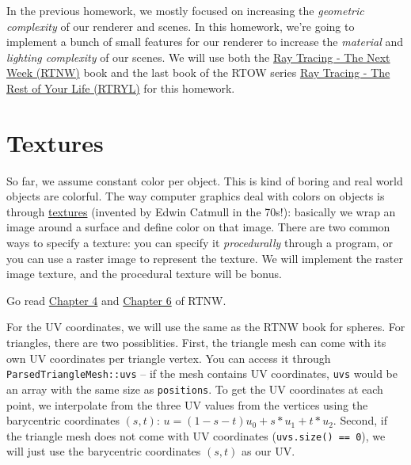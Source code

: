 
\usepackage{xcolor}




In the previous homework, we mostly focused on increasing the \emph{geometric complexity} of our renderer and scenes. In this homework, we're going to implement a bunch of small features for our renderer to increase the \emph{material} and \emph{lighting complexity} of our scenes. We will use both the \href{https://raytracing.github.io/books/RayTracingTheNextWeek.html}{Ray Tracing - The Next Week (RTNW)} book and the last book of the RTOW series \href{https://raytracing.github.io/books/RayTracingTheRestOfYourLife.html}{Ray Tracing - The Rest of Your Life (RTRYL)} for this homework.

\section{Textures}
So far, we assume constant color per object. This is kind of boring and real world objects are {\color{red}c}{\color{orange}o}{\color{green}l}{\color{blue}o}{\color{cyan}r}f{\color{magenta}u}{\color{violet}l}. The way computer graphics deal with colors on objects is through \href{https://en.wikipedia.org/wiki/Texture_mapping}{textures} (invented by Edwin Catmull in the 70s!): basically we wrap an image around a surface and define color on that image. There are two common ways to specify a texture: you can specify it \emph{procedurally} through a program, or you can use a raster image to represent the texture. We will implement the raster image texture, and the procedural texture will be bonus.

Go read \href{https://raytracing.github.io/books/RayTracingTheNextWeek.html#solidtextures}{Chapter 4} and \href{https://raytracing.github.io/books/RayTracingTheNextWeek.html#imagetexturemapping}{Chapter 6} of RTNW.

For the UV coordinates, we will use the same as the RTNW book for spheres. For triangles, there are two possiblities. First, the triangle mesh can come with its own UV coordinates per triangle vertex. You can access it through \lstinline{ParsedTriangleMesh::uvs} -- if the mesh contains UV coordinates, \lstinline{uvs} would be an array with the same size as \lstinline{positions}. To get the UV coordinates at each point, we interpolate from the three UV values from the vertices using the barycentric coordinates $(s, t)$: $u = (1 - s - t)u_0 + s * u_1 + t * u_2$.
Second, if the triangle mesh does not come with UV coordinates (\lstinline{uvs.size() == 0}), we will just use the barycentric coordinates $(s, t)$ as our UV.

